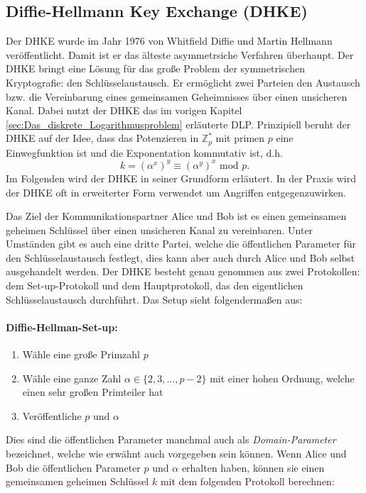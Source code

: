 \subsection{Diffie-Hellmann Key Exchange (DHKE)} \label{sec:DHKE}
Der DHKE wurde im Jahr 1976 von Whitfield Diffie und Martin Hellmann veröffentlicht. Damit ist er das älteste asymmetrsiche Verfahren überhaupt. Der DHKE bringt eine Lösung für das große Problem der symmetrischen Kryptografie: den Schlüsselaustausch. Er ermöglicht zwei Parteien den Austausch bzw. die Vereinbarung eines gemeinsamen Geheimnisses über einen unsicheren Kanal. Dabei nutzt der DHKE das im vorigen Kapitel \ref{sec:Das_diskrete_Logarithmusproblem} erläuterte DLP.  Prinzipiell beruht der DHKE auf der Idee, dass das Potenzieren in $\mathbb{Z}^*_p$ mit primen $p$ eine Einwegfunktion ist und die Exponentation kommutativ ist, d.h. $$k = (\alpha ^x)^y \equiv (\alpha ^y)^x \text{ mod } p.$$
Im Folgenden wird der DHKE in seiner Grundform erläutert. In der Praxis wird der DHKE oft in erweiterter Form verwendet um Angriffen entgegenzuwirken.

Das Ziel der Kommunikationspartner Alice und Bob ist es einen gemeinsamen geheimen Schlüssel über einen unsicheren Kanal zu vereinbaren. Unter Umständen gibt es auch eine dritte Partei, welche die öffentlichen Parameter für den Schlüsselaustausch festlegt, dies kann aber auch durch Alice und Bob selbst ausgehandelt werden. Der DHKE besteht genau genommen aus zwei Protokollen: dem Set-up-Protokoll und dem Hauptprotokoll, das den eigentlichen Schlüsselaustausch durchführt. Das Setup sieht folgendermaßen aus:
\paragraph{Diffie-Hellman-Set-up:}
\begin{enumerate}
\item Wähle eine große Primzahl $p$
\item Wähle eine ganze Zahl $\alpha \in \{2,3,..., p-2\}$ mit einer hohen Ordnung, welche einen sehr großen Primteiler hat
\item Veröffentliche $p$ und $\alpha$
\end{enumerate}

Dies sind die öffentlichen Parameter manchmal auch als \textit{Domain-Parameter} bezeichnet, welche wie erwähnt auch vorgegeben sein können. Wenn Alice und Bob die öffentlichen Parameter $p$ und $\alpha$ erhalten haben, können sie einen gemeinsamen geheimen Schlüssel $k$ mit dem folgenden Protokoll berechnen:

